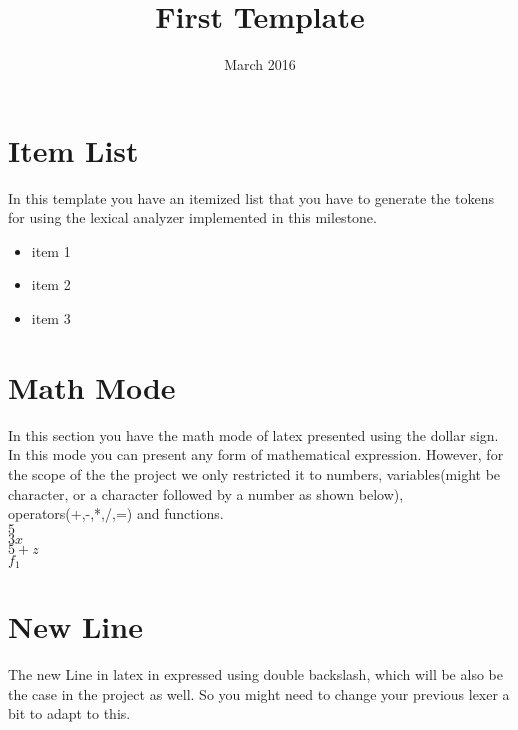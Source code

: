 \documentclass{article}
\begin{document}
\title{First Template}
\date{March 2016}
\maketitle


\section{Item List}
In this template you have an itemized list that you have to generate the tokens for using the lexical analyzer implemented in this milestone. \\

\begin{itemize}
\item item 1
\item item 2
\item item 3
\end{itemize}

\section{Math Mode}
In this section you have the math mode of latex presented using the dollar sign. In this mode you can present any form of mathematical expression. However, for the scope of the the project we only restricted it to numbers, variables(might be character, or a character followed by a number as shown below), operators(+,-,*,/,=) and functions. \\

$5$
\\
$3x$
\\
$5+z$
\\
$f_1$

\section{New Line}
The new Line in latex in expressed using double backslash, which will be also be the case in the project as well. So you might need to change your previous lexer a bit to adapt to this.
\end{document}
